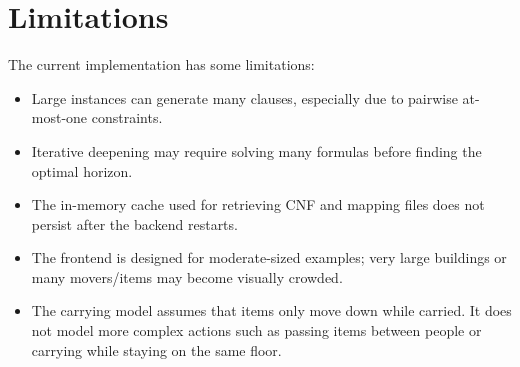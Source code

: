\section{Limitations} \label{sec:limitations}
The current implementation has some limitations:

\begin{itemize}
    \item Large instances can generate many clauses, especially due to pairwise at-most-one constraints.
    \item Iterative deepening may require solving many formulas before finding the optimal horizon.
    \item The in-memory cache used for retrieving CNF and mapping files does not persist after the backend restarts.
    \item The frontend is designed for moderate-sized examples; very large buildings or many movers/items may become visually crowded.
    \item The carrying model assumes that items only move down while carried.
    It does not model more complex actions such as passing items between people or carrying while staying on the same floor.
\end{itemize}